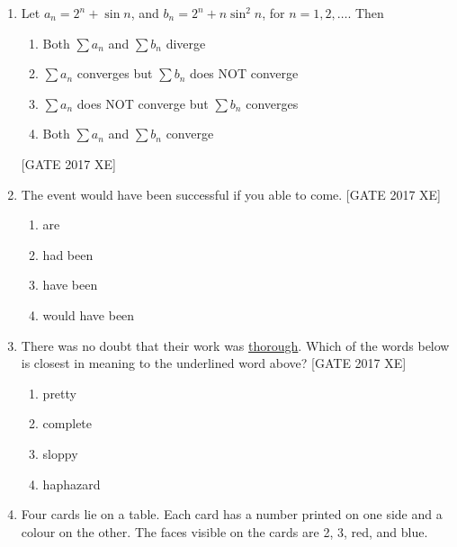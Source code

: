 \documentclass[journal,12pt,onecolumn]{IEEEtran}
\theoremstyle{remark}
\begin{document}
\begin{enumerate}
    \item Let $a_n = 2^n + \sin n$, and $b_n = 2^n + n \sin^2 n$, for $n = 1,2,\ldots$.  
    Then
    \begin{multicols}{2}
    \begin{enumerate}
        \item Both $\sum a_n$ and $\sum b_n$ diverge
        \item $\sum a_n$ converges but $\sum b_n$ does NOT converge
        \item $\sum a_n$ does NOT converge but $\sum b_n$ converges
        \item Both $\sum a_n$ and $\sum b_n$ converge
    \end{enumerate}
    \end{multicols}
    \hfill [GATE 2017 XE]

\item The event would have been successful if you \underline{\hspace{2cm}} able to come.  
\hfill [GATE 2017 XE]

\begin{multicols}{2}
\begin{enumerate}
    \item are
    \item had been
    \item have been
    \item would have been
\end{enumerate}
\end{multicols}

\item There was no doubt that their work was \underline{thorough}.  
Which of the words below is closest in meaning to the underlined word above?  
\hfill [GATE 2017 XE]

\begin{multicols}{2}
\begin{enumerate}
    \item pretty
    \item complete
    \item sloppy
    \item haphazard
\end{enumerate}
\end{multicols}

\item Four cards lie on a table. Each card has a number printed on one side and a colour on the other.  
The faces visible on the cards are 2, 3, red, and blue.  


\end{enumerate}
\end{document}
